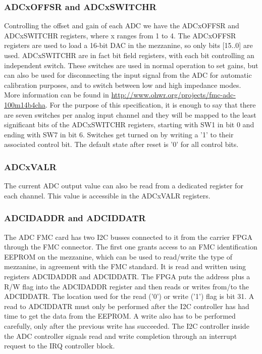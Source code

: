 \documentclass{article}
\begin{document}
\subsubsection{ADCxOFFSR and ADCxSWITCHR}
\label{sssec:gain_offs}
Controlling the offset and gain of each ADC we have the ADCxOFFSR and ADCxSWITCHR registers, where x ranges from 1 to 4. The ADCxOFFSR registers are used to load a 16-bit DAC in the mezzanine, so only bits [15..0] are used. ADCxSWITCHR are in fact bit field registers, with each bit controlling an independent switch. These switches are used in normal operation to set gains, but can also be used for disconnecting the input signal from the ADC for automatic calibration purposes, and to switch between low and high impedance modes. More information can be found in \href{http://www.ohwr.org/projects/fmc-adc-100m14b4cha}{http://www.ohwr.org/projects/fmc-adc-100m14b4cha}. For the purpose of this specification, it is enough to say that there are seven switches per analog input channel and they will be mapped to the least significant bits of the ADCxSWITCHR registers, starting with SW1 in bit 0 and ending with SW7 in bit 6. Switches get turned on by writing a '1' to their associated control bit. The default state after reset is '0' for all control bits.

\subsubsection{ADCxVALR}
The current ADC output value can also be read from a dedicated register for each channel. This value is accessible in the ADCxVALR registers.

\subsubsection{ADCIDADDR and ADCIDDATR}
The ADC FMC card has two I2C busses connected to it from the carrier FPGA through the FMC connector. The first one grants access to an FMC identification EEPROM on the mezzanine, which can be used to read/write the type of mezzanine, in agreement with the FMC standard. It is read and written using registers ADCIDADDR and ADCIDDATR. The FPGA puts the address plus a R/W flag into the ADCIDADDR register and then reads or writes from/to the ADCIDDATR. The location used for the read ('0') or write ('1') flag is bit 31. A read to ADCIDDATR must only be performed after the I2C controller has had time to get the data from the EEPROM. A write also has to be performed carefully, only after the previous write has succeeded. The I2C controller inside the ADC controller signals read and write completion through an interrupt request to the IRQ controller block. 
\end{document}

